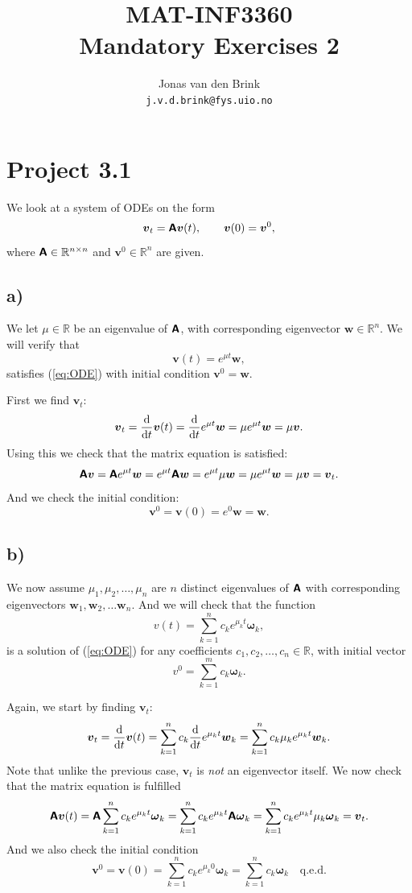 \documentclass[a4paper, 11pt, notitlepage, english]{article}
\author{Jonas van den Brink \\ \texttt{j.v.d.brink@fys.uio.no}}
\title{MAT-INF3360 \\ Mandatory Exercises 2}
\renewcommand{\d}{{\rm d}}
\newcommand{\bt}[1]{\boldsymbol{#1}}
\newcommand{\mat}[1]{\textsf{\textbf{#1}}}
\begin{document}
\section*{Project 3.1}
We look at a system of ODEs on the form
\begin{equation}
\bt{v}_t = \mat{A} \bt{v}(t), \qquad \bt{v}(0) = \bt{v}^0, \label{eq:ODE}
\end{equation}
where $\mat{A} \in \mathbb{R}^{n\times n}$ and $\bt{v}^0 \in \mathbb{R}^n$ are given.

\subsection*{a)}
We let $\mu \in \mathbb{R}$ be an eigenvalue of $\mat{A}$, with corresponding eigenvector $\bt{w} \in \mathbb{R}^n$. We will verify that
$$\bt{v}(t) = e^{\mu t}\bt{w},$$
satisfies (\ref{eq:ODE}) with initial condition $\bt{v}^0 = \bt{w}$.

First we find $\bt{v}_t$:
$$\bt{v}_t = \frac{\d}{\d t}\bt{v}(t) = \frac{\d}{\d t}e^{\mu t}\bt{w} = \mu e^{\mu t} \bt{w} = \mu\bt{v}.$$
Using this we check that the matrix equation is satisfied:
$$\mat{A}\bt{v} = \mat{A}e^{\mu t}\bt{w} = e^{\mu t}\mat{A}\bt{w} = e^{\mu t}\mu \bt{w} = \mu e^{\mu t}\bt{w} = \mu \bt{v} = \bt{v}_t.$$
And we check the initial condition:
$$\bt{v}^0 = \bt{v}(0) = e^{0}\bt{w} = \bt{w}.$$

\subsection*{b)}
We now assume $\mu_1, \mu_2, \ldots, \mu_n$ are $n$ distinct eigenvalues of $\mat{A}$ with corresponding eigenvectors $\bt{w}_1, \bt{w}_2, \ldots \bt{w}_n$. And we will check that the function
$$v(t)  = \sum_{k=1}^n c_k e^{\mu_k t} \bt{\omega}_k,$$
is a solution of (\ref{eq:ODE}) for any coefficients $c_1, c_2, \ldots, c_n \in \mathbb{R}$, with initial vector
$$v^0 = \sum_{k=1}^m c_k \bt{\omega}_k.$$

Again, we start by finding $\bt{v}_t$:
$$\bt{v}_t = \frac{\d}{\d t}\bt{v}(t) = \sum_{k=1}^n c_k \frac{\d}{\d t}e^{\mu_k t}\bt{w}_k = \sum_{k=1}^n c_k \mu_k e^{\mu_k t} \bt{w}_k.$$
Note that unlike the previous case, $\bt{v}_t$ is \emph{not} an eigenvector itself. We now check that the matrix equation is fulfilled
$$\mat{A}\bt{v}(t) = \mat{A}\sum_{k=1}^n c_k e^{\mu_k t} \bt{\omega}_k = \sum_{k=1}^n c_k e^{\mu_k t} \mat{A}\bt{\omega}_k = \sum_{k=1}^n c_k e^{\mu_k t} \mu_k \bt{\omega}_k = \bt{v}_t.$$
And we also check the initial condition
$$\bt{v}^0 = \bt{v}(0) = \sum_{k=1}^n c_k e^{\mu_k 0} \bt{\omega}_k = \sum_{k=1}^n c_k \bt{\omega}_k \quad \mbox{q.e.d.}$$
\end{document}
